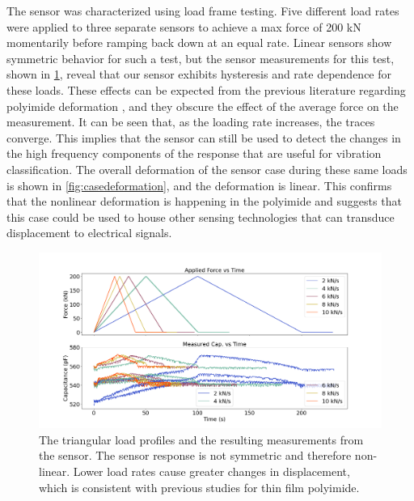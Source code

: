 The sensor was characterized using load frame testing.
Five different load rates were applied to three separate sensors to achieve a max force of 200 kN 
 momentarily before ramping back down at an equal rate. 
Linear sensors show symmetric behavior for such a test, 
 but the sensor measurements for this test, shown in \ref{fig:triangleload}, 
 reveal that our sensor exhibits hysteresis and rate dependence for these loads.
These effects can be expected from the previous literature regarding polyimide deformation
\cite{Khan14, VALAVALA20071161, dharmadasa20, li21, he16, wang20, chang08, wei08, zhu20, dobrzynska12, Bodini19},
 and they obscure the effect of the average force on the measurement.
It can be seen that, as the loading rate increases, the traces converge.
This implies that the sensor can still be used to detect the changes in the high frequency components 
 of the response that are useful for vibration classification.
The overall deformation of the sensor case during these same loads is shown in \ref{fig:casedeformation},
 and the deformation is linear. 
This confirms that the nonlinear deformation is happening in the polyimide
 and suggests that this case could be used to house other sensing technologies
 that can transduce displacement to electrical signals.

\begin{figure}[t!]
\centering
\centerline{\includegraphics[width=5.5in]{figures/p1_media/Fig4.png}}
\caption{
The triangular load profiles and the resulting measurements from the sensor. 
The sensor response is not symmetric and therefore non-linear.
Lower load rates cause greater changes in displacement, which is consistent with previous studies for 
 thin film polyimide. 
}
\label{fig:triangleload}
\end{figure}


